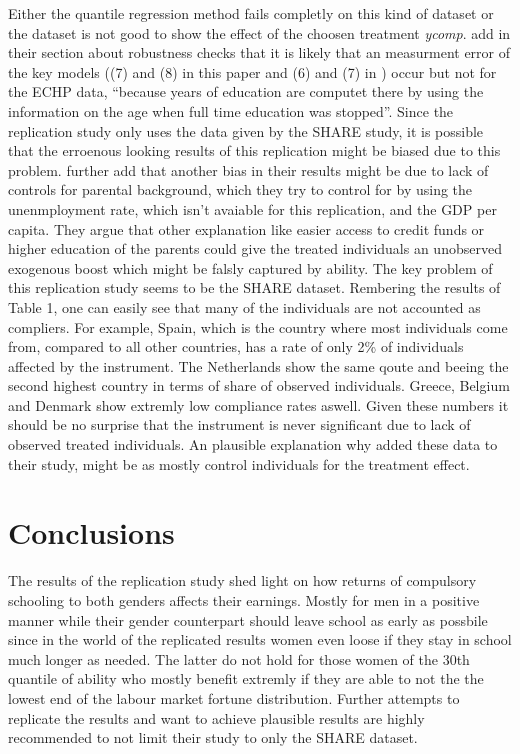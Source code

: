 \documentclass[12pt,a4paper]{article}
\begin{document}
Either the quantile regression method fails completly on this kind of
dataset or the dataset is not good to show the effect of the choosen
treatment \textit{ycomp}. \textcite{brunello} add in their section about
robustness checks that it is likely that an measurment error of the key
models ((7) and (8) in this paper and (6) and (7) in
\textcite{brunello}) occur but not for the ECHP data, \enquote{because
years of education are computet there by using the information on the
age when full time education was stopped}. Since the replication study
only uses the data given by the SHARE study, it is possible that the
erroenous looking results of this replication might be biased due to
this problem. \textcite{brunello} further add that another bias in their
results might be due to lack of controls for parental background, which
they try to control for by using the unenmployment rate, which isn't
avaiable for this replication, and the GDP per capita. They argue that
other explanation like easier access to credit funds or higher education
of the parents could give the treated individuals an unobserved
exogenous boost which might be falsly captured by ability. The key
problem of this replication study seems to be the SHARE dataset.
Rembering the results of Table 1, one can easily see that many of the
individuals are not accounted as compliers. For example, Spain, which is
the country where most individuals come from, compared to all other
countries, has a rate of only 2\% of individuals affected by the
instrument. The Netherlands show the same qoute and beeing the second
highest country in terms of share of observed individuals. Greece,
Belgium and Denmark show extremly low compliance rates aswell. Given
these numbers it should be no surprise that the instrument is never
significant due to lack of observed treated individuals. An plausible
explanation why \textcite{brunello} added these data to their study,
might be as mostly control individuals for the treatment effect.

\hypertarget{conclusions}{%
\section{Conclusions}\label{conclusions}}

The results of the replication study shed light on how returns of
compulsory schooling to both genders affects their earnings. Mostly for
men in a positive manner while their gender counterpart should leave
school as early as possbile since in the world of the replicated results
women even loose if they stay in school much longer as needed. The
latter do not hold for those women of the 30th quantile of ability who
mostly benefit extremly if they are able to not the the lowest end of
the labour market fortune distribution. Further attempts to replicate
the results and want to achieve plausible results are highly recommended
to not limit their study to only the SHARE dataset.

\newpage

\printbibliography
\end{document}
